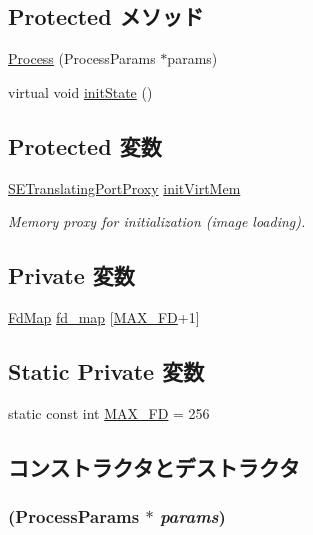 \subsection*{Protected メソッド}
\begin{DoxyCompactItemize}
\item 
\hyperlink{classProcess_a2c30075e49c804623c22b25934cfa02a}{Process} (ProcessParams $\ast$params)
\item 
virtual void \hyperlink{classProcess_a3c34ea9b29f410748d4435a667484924}{initState} ()
\end{DoxyCompactItemize}
\subsection*{Protected 変数}
\begin{DoxyCompactItemize}
\item 
\hyperlink{classSETranslatingPortProxy}{SETranslatingPortProxy} \hyperlink{classProcess_a280be1c93dee29cd2c6d5d1502c60a9b}{initVirtMem}
\begin{DoxyCompactList}\small\item\em Memory proxy for initialization (image loading). \item\end{DoxyCompactList}\end{DoxyCompactItemize}
\subsection*{Private 変数}
\begin{DoxyCompactItemize}
\item 
\hyperlink{classProcess_1_1FdMap}{FdMap} \hyperlink{classProcess_ad817e277dc908ed0f32c4180c5ddb350}{fd\_\-map} \mbox{[}\hyperlink{classProcess_a2a18c1a4811677d6adabab2287226bb1}{MAX\_\-FD}+1\mbox{]}
\end{DoxyCompactItemize}
\subsection*{Static Private 変数}
\begin{DoxyCompactItemize}
\item 
static const int \hyperlink{classProcess_a2a18c1a4811677d6adabab2287226bb1}{MAX\_\-FD} = 256
\end{DoxyCompactItemize}


\subsection{コンストラクタとデストラクタ}
\hypertarget{classProcess_a2c30075e49c804623c22b25934cfa02a}{
\subsubsection[{Process}]{ (ProcessParams $\ast$ {\em params})}}
\label{classProcess_a2c30075e49c804623c22b25934cfa02a}



